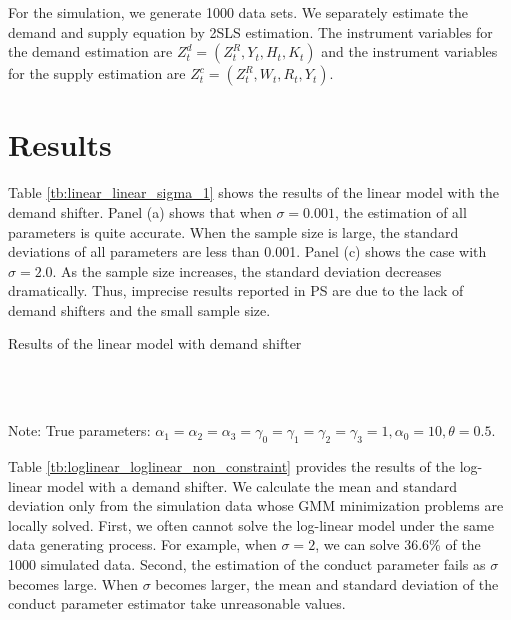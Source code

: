 \documentclass[11pt, a4paper]{article}
\begin{document}
For the simulation, we generate 1000 data sets.
We separately estimate the demand and supply equation by 2SLS estimation.
The instrument variables for the demand estimation are $Z^{d}_{t} = (Z^{R}_{t}, Y_t, H_{t}, K_{t})$ and the instrument variables for the supply estimation are $Z^{c}_{t} = (Z^{R}_{t}, W_{t}, R_t, Y_t)$. 


\section{Results}

Table \ref{tb:linear_linear_sigma_1} shows the results of the linear model with the demand shifter.
Panel (a) shows that when $\sigma = 0.001$, the estimation of all parameters is quite accurate.
When the sample size is large, the standard deviations of all parameters are less than 0.001. 
Panel (c) shows the case with $\sigma = 2.0$. As the sample size increases, the standard deviation decreases dramatically. 
Thus, imprecise results reported in PS are due to the lack of demand shifters and the small sample size.



\begin{table}[!htbp]
  \begin{center}
      \caption{Results of the linear model with demand shifter}
      \label{tb:linear_linear_sigma_1} 
      \subfloat[$\sigma=0.001$]{}\\
      \subfloat[$\sigma=0.5$]{}\\
    \subfloat[$\sigma=2.0$]{}
  \end{center}\footnotesize
  Note: True parameters: $\alpha_1 = \alpha_2 = \alpha_3 = \gamma_0 = \gamma_1 = \gamma_2  = \gamma_3 = 1, \alpha_0 = 10, \theta = 0.5.$
\end{table} 

Table \ref{tb:loglinear_loglinear_non_constraint} provides the results of the log-linear model with a demand shifter.
We calculate the mean and standard deviation only from the simulation data whose GMM minimization problems are locally solved. 
First, we often cannot solve the log-linear model under the same data generating process. For example, when $\sigma=2$, we can solve 36.6\% of the 1000 simulated data.
Second, the estimation of the conduct parameter fails as $\sigma$ becomes large. 
When $\sigma$ becomes larger, the mean and standard deviation of the conduct parameter estimator take unreasonable values.
\end{document}
